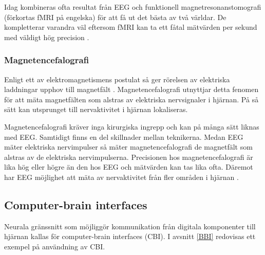 \documentclass[12pt, a4paper]{article}
\begin{document}
Idag kombineras ofta resultat från EEG och funktionell magnetresonanstomografi (förkortas fMRI på engelska) för att få ut det bästa av två världar. De kompletterar varandra väl eftersom fMRI kan ta ett fåtal mätvärden per sekund med väldigt hög precision \cite{eeg_fmri}.


\subsubsection{Magnetencefalografi}
\label{meg}

Enligt ett av elektromagnetismens postulat så ger rörelsen av elektriska laddningar upphov till magnetfält \cite{electromagnetism}. Magnetencefalografi utnyttjar detta fenomen för att mäta magnetfälten som alstras av elektriska nervsignaler i hjärnan. På så sätt kan utsprunget till nervaktivitet i hjärnan lokaliseras.

Magnetencefalografi kräver inga kirurgiska ingrepp och kan på många sätt liknas med EEG. Samtidigt finns en del skillnader mellan teknikerna. Medan EEG mäter elektriska nervimpulser så mäter magnetencefalografi de magnetfält som alstras av de elektriska nervimpulserna. Precisionen hos magnetencefalografi är lika hög eller högre än den hos EEG och mätvärden kan tas lika ofta. Däremot har EEG möjlighet att mäta av nervaktivitet från fler områden i hjärnan \cite{meg_eeg}.

%
%


\subsection{Computer-brain interfaces}

Neurala gränssnitt som möjliggör kommunikation från digitala komponenter till hjärnan kallas för computer-brain interfaces (CBI). I avsnitt \ref{BBI} redovisas ett exempel på användning av CBI.

\end{document}
